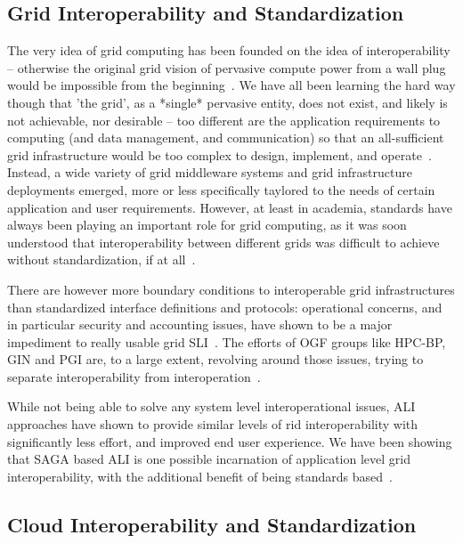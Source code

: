 \documentclass[10pt,conference,final,letterpaper,twoside,twocolumn,]{IEEEtran}
\begin{document}
 \subsection*{Grid Interoperability and Standardization}

 The very idea of grid computing has been founded on the idea of
 interoperability -- otherwise the original grid vision of pervasive
 compute power from a wall plug would be impossible from the
 beginning~\cite{blueprint}.  We have all been learning the hard way
 though that 'the grid', as a *single* pervasive entity, does not
 exist, and likely is not achievable, nor desirable -- too different
 are the application requirements to computing (and data management,
 and communication) so that an all-sufficient grid infrastructure
 would be too complex to design, implement, and
 operate~\cite{ogsa-use-cases}.  Instead, a wide variety of grid
 middleware systems and grid infrastructure deployments emerged, more
 or less specifically taylored to the needs of certain application and
 user requirements.  However, at least in academia, standards have
 always been playing an important role for grid computing, as it was
 soon understood that interoperability between different grids was
 difficult to achieve without standardization, if at all~\cite{...}.

 There are however more boundary conditions to interoperable grid
 infrastructures than standardized interface definitions and
 protocols: operational concerns, and in particular security and
 accounting issues, have shown to be a major impediment to really
 usable grid SLI~\cite{gin-usecases}.  The efforts of OGF groups like
 HPC-BP, GIN and PGI are, to a large extent, revolving around those
 issues, trying to separate interoperability from
 interoperation~\cite{gin-papers, ogf-www}.

 While not being able to solve any system level interoperational
 issues, ALI approaches have shown to provide similar levels of rid
 interoperability with significantly less effort, and improved end
 user experience.  We have been showing that SAGA based ALI is one
 possible incarnation of application level grid interoperability, with
 the additional benefit of being standards based~\cite{saga-gin,
 mandelbrot-www}.

\subsection*{Cloud Interoperability and Standardization}
\end{document}
